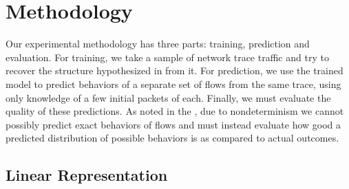 \documentclass[conference]{IEEEtran}
\begin{document}
\section{Methodology}

Our experimental methodology has three parts:
training, prediction and evaluation.
For training, we take a sample of network trace traffic and try to recover the structure hypothesized in  from it.
For prediction, we use the trained model to predict behaviors of a separate set of flows from the same trace, using only knowledge of a few initial packets of each.
Finally, we must evaluate the quality of these predictions.
As noted in the , due to nondeterminism we cannot possibly predict exact behaviors of flows and must instead evaluate how good a predicted distribution of possible behaviors is as compared to actual outcomes.


\subsection{Linear Representation}
\end{document}
